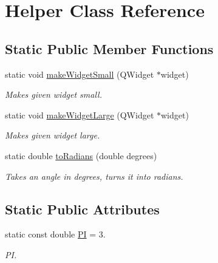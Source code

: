 \hypertarget{classHelper}{\section{\-Helper \-Class \-Reference}
\label{classHelper}
}
\subsection*{\-Static \-Public \-Member \-Functions}
\begin{DoxyCompactItemize}
\item 
static void \hyperlink{classHelper_a2eeb1ba71a75f4d0f59c6efdd429a1b7}{make\-Widget\-Small} (\-Q\-Widget $\ast$widget)
\begin{DoxyCompactList}\small\item\em \-Makes given widget small. \end{DoxyCompactList}\item 
static void \hyperlink{classHelper_a1c444bceb723964a341b1c8b2bd2f95c}{make\-Widget\-Large} (\-Q\-Widget $\ast$widget)
\begin{DoxyCompactList}\small\item\em \-Makes given widget large. \end{DoxyCompactList}\item 
static double \hyperlink{classHelper_ad085317d0b7ad0e5ac3d08b559a7015f}{to\-Radians} (double degrees)
\begin{DoxyCompactList}\small\item\em \-Takes an angle in degrees, turns it into radians. \end{DoxyCompactList}\end{DoxyCompactItemize}
\subsection*{\-Static \-Public \-Attributes}
\begin{DoxyCompactItemize}
\item 
\hypertarget{classHelper_a13faf9f5fa52f832db1a99b4c0c91cb8}{static const double \hyperlink{classHelper_a13faf9f5fa52f832db1a99b4c0c91cb8}{\-P\-I} = 3.}\label{classHelper_a13faf9f5fa52f832db1a99b4c0c91cb8}

\begin{DoxyCompactList}\small\item\em \-P\-I. \end{DoxyCompactList}\end{DoxyCompactItemize}


